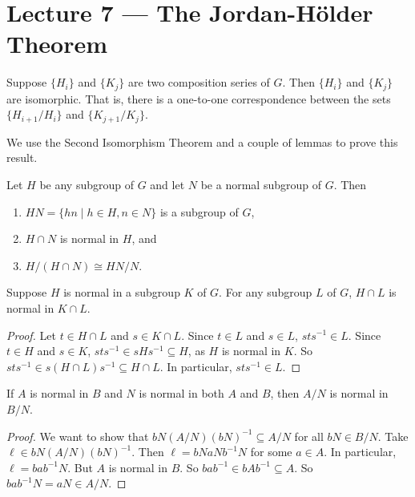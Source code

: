 \section{Lecture 7 — The Jordan-Hölder Theorem}

\begin{theorem}\label{thm:jordan_holder}
	Suppose $\{H_i\}$ and $\{K_j\}$ are two composition series of $G$. Then $\{H_i\}$ and $\{K_j\}$ are isomorphic. That is, there is a one-to-one correspondence between the sets $\{H_{i+1}/H_i\}$ and $\{K_{j+1}/K_j\}$.
\end{theorem}

We use the Second Isomorphism Theorem and a couple of lemmas to prove this result.

\begin{theorem}\label{thm:iso2}
	Let $H$ be any subgroup of $G$ and let $N$ be a normal subgroup of $G$. Then
	\begin{enumerate}
		\item $HN=\{hn\mid h\in H,n\in N\}$ is a subgroup of $G$,
		\item $H\cap N$ is normal in $H$, and
		\item $H/(H\cap N)\cong HN/N$. 
	\end{enumerate}
\end{theorem}

\begin{lemma}\label{lem:jh1}
	Suppose $H$ is normal in a subgroup $K$ of $G$. For any subgroup $L$ of $G$, $H\cap L$ is normal in $K\cap L$.
\end{lemma}

\begin{proof}
	Let $t\in H\cap L$ and $s\in K\cap L$. Since $t\in L$ and $s\in L$, $sts^{-1}\in L$. Since $t\in H$ and $s\in K$, $sts^{-1}\in sHs^{-1}\subseteq H$, as $H$ is normal in $K$. So $sts^{-1}\in s(H\cap L)s^{-1}\subseteq H\cap L$. In particular, $sts^{-1}\in L$.
\end{proof}

\begin{lemma}\label{lem:jh2}
	If $A$ is normal in $B$ and $N$ is normal in both $A$ and $B$, then $A/N$ is normal in $B/N$.
\end{lemma}

\begin{proof}
	We want to show that $bN(A/N)(bN)^{-1}\subseteq A/N$ for all $bN\in B/N$. Take $\ell\in bN(A/N)(bN)^{-1}$. Then $\ell=bNaNb^{-1}N$ for some $a\in A$. In particular, $\ell=bab^{-1}N$. But $A$ is normal in $B$. So $bab^{-1}\in bAb^{-1}\subseteq A$. So $bab^{-1}N=aN\in A/N$.
\end{proof}

